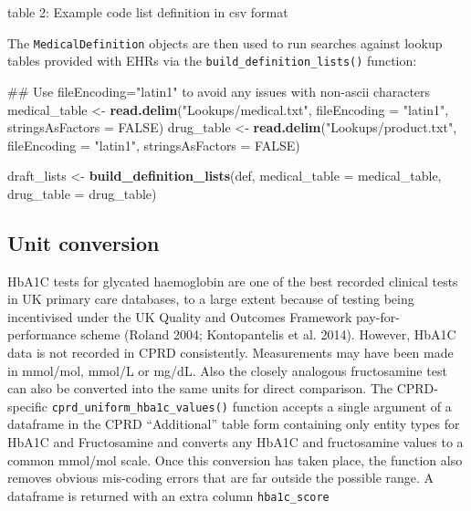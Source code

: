 \documentclass[]{article}
\newenvironment{Shaded}{\begin{snugshade}}{\end{snugshade}}
\newcommand{\KeywordTok}[1]{\textcolor[rgb]{0.13,0.29,0.53}{\textbf{{#1}}}}
\newcommand{\DataTypeTok}[1]{\textcolor[rgb]{0.13,0.29,0.53}{{#1}}}
\newcommand{\StringTok}[1]{\textcolor[rgb]{0.31,0.60,0.02}{{#1}}}
\newcommand{\OtherTok}[1]{\textcolor[rgb]{0.56,0.35,0.01}{{#1}}}
\newcommand{\NormalTok}[1]{{#1}}
\begin{document}
table 2: Example code list definition in csv format

The \texttt{MedicalDefinition} objects are then used to run searches
against lookup tables provided with EHRs via the
\texttt{build\_definition\_lists()} function:

\begin{Shaded}
\begin{Highlighting}[]
\NormalTok{## Use fileEncoding="latin1" to avoid any issues with non-ascii characters}
\NormalTok{medical_table <-}\StringTok{ }\KeywordTok{read.delim}\NormalTok{(}\StringTok{"Lookups/medical.txt"}\NormalTok{, }\DataTypeTok{fileEncoding =} \StringTok{"latin1"}\NormalTok{, }\DataTypeTok{stringsAsFactors =} \OtherTok{FALSE}\NormalTok{)}
\NormalTok{drug_table <-}\StringTok{ }\KeywordTok{read.delim}\NormalTok{(}\StringTok{"Lookups/product.txt"}\NormalTok{, }\DataTypeTok{fileEncoding =} \StringTok{"latin1"}\NormalTok{, }\DataTypeTok{stringsAsFactors =} \OtherTok{FALSE}\NormalTok{)}

\NormalTok{draft_lists <-}\StringTok{ }\KeywordTok{build_definition_lists}\NormalTok{(def, }\DataTypeTok{medical_table =} \NormalTok{medical_table, }\DataTypeTok{drug_table =} \NormalTok{drug_table)}
\end{Highlighting}
\end{Shaded}

\subsection{Unit conversion}\label{unit-conversion}

HbA1C tests for glycated haemoglobin are one of the best recorded
clinical tests in UK primary care databases, to a large extent because
of testing being incentivised under the UK Quality and Outcomes
Framework pay-for-performance scheme (Roland 2004; Kontopantelis et al.
2014). However, HbA1C data is not recorded in CPRD consistently.
Measurements may have been made in mmol/mol, mmol/L or mg/dL. Also the
closely analogous fructosamine test can also be converted into the same
units for direct comparison. The CPRD-specific
\texttt{cprd\_uniform\_hba1c\_values()} function accepts a single
argument of a dataframe in the CPRD ``Additional'' table form containing
only entity types for HbA1C and Fructosamine and converts any HbA1C and
fructosamine values to a common mmol/mol scale. Once this conversion has
taken place, the function also removes obvious mis-coding errors that
are far outside the possible range. A dataframe is returned with an
extra column \texttt{hba1c\_score}
\end{document}
